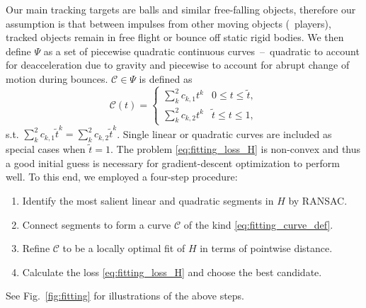 \documentclass[10pt,twocolumn,letterpaper]{article}
\begin{document}
Our main tracking targets are balls and similar free-falling objects, therefore our assumption is that between impulses from other moving objects (\eg~players), tracked objects remain in free flight or bounce off static rigid bodies. We then define $\Psi$ as a set of piecewise quadratic continuous curves~--~quadratic to account for deacceleration due to gravity and piecewise to account for abrupt change of motion during bounces. $\mathcal{C}\in\Psi$ is defined as
\begin{equation}
	\label{eq:fitting_curve_def}
	\mathcal{C}(t) = \begin{cases} \sum_k^2 c_{k,1}t^k & 0\leq t \leq \tilde{t}, \\
		\sum_k^2 c_{k,2}t^k & \tilde{t} \leq t \leq 1,
	\end{cases}
\end{equation}
s.t. $\sum_k^2 c_{k,1}{\tilde{t}}^k = \sum_k^2 c_{k,2}{\tilde{t}}^k$. Single linear or quadratic curves are included as special cases when $\tilde{t}=1$. 
The problem \eqref{eq:fitting_loss_H} is non-convex and thus a good initial guess is necessary for gradient-descent optimization to perform well. To this end, we employed a four-step procedure:
\vspace*{-0.5em}
\begin{enumerate}[leftmargin=*]
	\setlength\itemsep{-0.25em}
	\item Identify the most salient linear and quadratic segments in $H$ by RANSAC.
	\item Connect segments to form a curve $\mathcal{C}$ of the kind \eqref{eq:fitting_curve_def}.
	\item Refine $\mathcal{C}$ to be a locally optimal fit of $H$ in terms of pointwise distance.
	\item Calculate the loss \eqref{eq:fitting_loss_H} and choose the best candidate.
\end{enumerate}
\vspace*{-0.5em}
See Fig.~\ref{fig:fitting} for illustrations of the above steps. 
\end{document}
